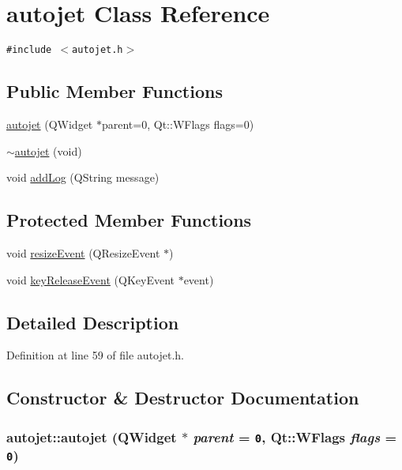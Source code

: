 \hypertarget{classautojet}{
\section{autojet Class Reference}
\label{classautojet}
}
{\tt \#include $<$autojet.h$>$}

\subsection*{Public Member Functions}
\begin{CompactItemize}
\item 
\hyperlink{classautojet_a83689a4c6fc7350dac9d3a45bc60c05}{autojet} (QWidget $\ast$parent=0, Qt::WFlags flags=0)
\item 
\hyperlink{classautojet_7212daec39a5deac5eb4fb4588a35455}{$\sim$autojet} (void)
\item 
void \hyperlink{classautojet_640ed2fd0823498ed55c79127564d860}{addLog} (QString message)
\end{CompactItemize}
\subsection*{Protected Member Functions}
\begin{CompactItemize}
\item 
void \hyperlink{classautojet_7114cf8399871627b93ebcf6c6ef9f95}{resizeEvent} (QResizeEvent $\ast$)
\item 
void \hyperlink{classautojet_04fa5ae957fcba538b0ff39e46a5642b}{keyReleaseEvent} (QKeyEvent $\ast$event)
\end{CompactItemize}


\subsection{Detailed Description}


Definition at line 59 of file autojet.h.

\subsection{Constructor \& Destructor Documentation}
\hypertarget{classautojet_a83689a4c6fc7350dac9d3a45bc60c05}{
\subsubsection[{autojet}]{\setlength{\rightskip}{0pt plus 5cm}autojet::autojet (QWidget $\ast$ {\em parent} = {\tt 0}, \/  Qt::WFlags {\em flags} = {\tt 0})}}
\label{classautojet_a83689a4c6fc7350dac9d3a45bc60c05}




